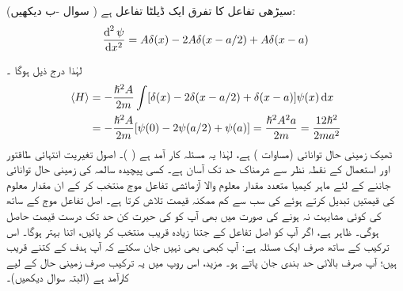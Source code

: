  

  سیڑھی تفاعل کا تفرق ایک  ڈیلٹا  تفاعل ہے ( سوال   -ب دیکھیں):
\begin{align}
\frac{\dif^{\,2}{\psi}}{\dif{x^{2}}}=A\delta(x)-2A\delta(x-a/2)+A\delta(x-a)
\end{align}

 لہٰذا درج ذیل ہوگا ۔
\begin{align} 
\langle H \rangle &= -\frac{\hslash^{2}A}{2m}\int[\delta(x)-2\delta(x-a/2)+\delta(x-a)]\psi(x)\dif{x}\nonumber\\
&= -\frac{\hslash^{2}A}{2m}[\psi(0)-2\psi(a/2)+\psi(a)]=\frac{\hslash^{2}A^{2}a}{2m}=\frac{12\hslash^{2}}{2ma^{2}}
\end{align}
 ٹھیک زمینی حال توانائی  (مساوات  ) ہے، لہٰذا یہ مسئلہ کار آمد ہے ( )۔
اصول تغیریت انتہائی طاقتور اور استعمال کے نقطہ نظر سے شرمناک حد تک آسان ہے۔ کسی پیچیدہ سالمہ کی زمینی حال توانائی جاننے کے لئے ماہر کیمیا    متعدد مقدار معلوم  والا   آزمائشی تفاعل موج منتخب کر کے  ان مقدار معلوم  کی قیمتیں تبدیل کرتے ہوئے  کی سب سے کم ممکنہ قیمت تلاش کرتا ہے۔ اصل تفاعل موج کے ساتھ  کی کوئی مشابہت نہ  ہونے کی صورت میں بھی آپ کو   کی حیرت کن حد تک درست قیمت حاصل ہوگی۔ ظاہر ہے،  اگر آپ   کو اصل  تفاعل کے جتنا  زیادہ قریب منتخب کر پائیں،  اتنا بہتر ہوگا۔ اس ترکیب کے ساتھ صرف ایک  مسئلہ  ہے:  آپ کبھی بھی نہیں  جان  سکتے کہ آپ ہدف  کے کتنے قریب ہیں؛  آپ صرف  بالائی حد بندی جان پاتے ہو۔  مزید،  اس روپ میں یہ ترکیب صرف زمینی حال کے لیے کارآمد ہے (البتہ سوال    دیکھیں)۔

